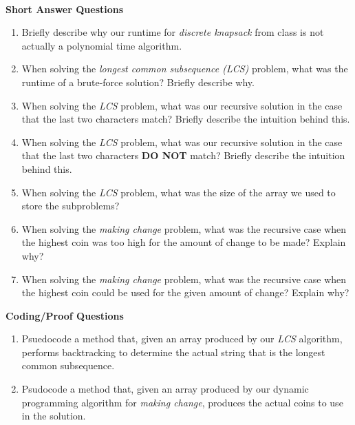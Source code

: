 \documentclass[10pt]{article}
\newcounter{pagenum}
\newcommand{\pageheader}[1]{
\clearpage\vspace*{-0.4in}\noindent{\large\bf{{#1}}}
\addtocounter{pagenum}{1}
\cfoot{}
}
\begin{document}

\pageheader{Dynamic Programming: Advanced}

\noindent \\
\textbf{Short Answer Questions}

\begin{enumerate}
	\setlength\itemsep{0.25em}
	\item Briefly describe why our runtime for \emph{discrete knapsack} from class is not actually a polynomial time algorithm.
	\item When solving the \emph{longest common subsequence (LCS)} problem, what was the runtime of a brute-force solution? Briefly describe why.
	\item When solving the \emph{LCS} problem, what was our recursive solution in the case that the last two characters match? Briefly describe the intuition behind this.
	\item When solving the \emph{LCS} problem, what was our recursive solution in the case that the last two characters \textbf{DO NOT} match? Briefly describe the intuition behind this.
	\item When solving the \emph{LCS} problem, what was the size of the array we used to store the subproblems?
	\item When solving the \emph{making change} problem, what was the recursive case when the highest coin was too high for the amount of change to be made? Explain why?
	\item When solving the \emph{making change} problem, what was the recursive case when the highest coin could be used for the given amount of change? Explain why?
\end{enumerate}

\vspace{0.5in}

\textbf{Coding/Proof Questions}
\begin{enumerate}
	\setlength\itemsep{0.25em}
	\item Psuedocode a method that, given an array produced by our \emph{LCS} algorithm, performs backtracking to determine the actual string that is the longest common subsequence.
	\item Psudocode a method that, given an array produced by our dynamic programming algorithm for \emph{making change}, produces the actual coins to use in the solution.
\end{enumerate}
\end{document}
